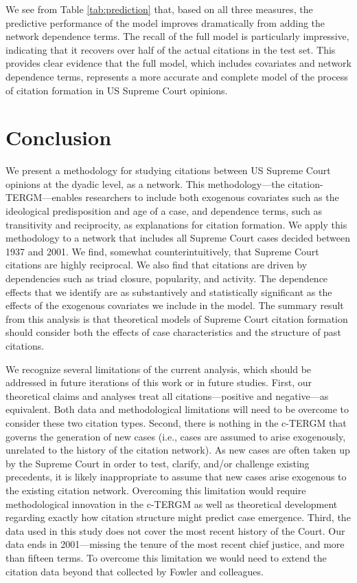 \documentclass[headsepline=true, abstracton]{scrartcl}
\begin{document}
We see from Table \ref{tab:prediction} that, based on all three measures, the predictive performance of the model improves dramatically from adding the network dependence terms. The recall of the full model is particularly impressive, indicating that it recovers over half of the actual citations in the test set. This provides clear evidence that the full model, which includes covariates and network dependence terms, represents a more accurate and complete model of the process of citation formation in US Supreme Court opinions.

\section{Conclusion}

We present a methodology for studying citations between US Supreme Court opinions at the dyadic level, as a network. This methodology---the citation-TERGM---enables researchers to include both exogenous covariates such as the ideological predisposition and age of a case, and dependence terms, such as transitivity and reciprocity, as explanations for citation formation. We apply this methodology to a network that includes all Supreme Court cases decided between 1937 and 2001. We find, somewhat counterintuitively, that Supreme Court citations are highly reciprocal. We also find that citations are driven by dependencies such as triad closure, popularity, and activity. The dependence effects that we identify are as substantively and statistically significant as the effects of the exogenous covariates we include in the model. The summary result from this analysis is that theoretical models of Supreme Court citation formation should consider both the effects of case characteristics and the structure of past citations. 

We recognize several limitations of the current analysis, which should be addressed in future iterations of this work or in future studies. First, our theoretical claims and analyses treat all citations---positive and negative---as equivalent. Both data and methodological limitations will need to be overcome to consider these two citation types. Second, there is nothing in the c-TERGM that governs the generation of new cases (i.e., cases are assumed to arise exogenously, unrelated to the history of the citation network). As new cases are often taken up by the Supreme Court in order to test, clarify, and/or challenge existing precedents, it is likely inappropriate to assume that new cases arise exogenous to the existing citation network. Overcoming this limitation would require methodological innovation in the c-TERGM as well as theoretical development regarding exactly how citation structure might predict case emergence. Third, the data used in this study does not cover the most recent history of the Court. Our data ends in 2001---missing the tenure of the most recent chief justice, and more than fifteen terms. To overcome this limitation we would need to extend the citation data beyond that collected by Fowler and colleagues. 




 

\end{document}
